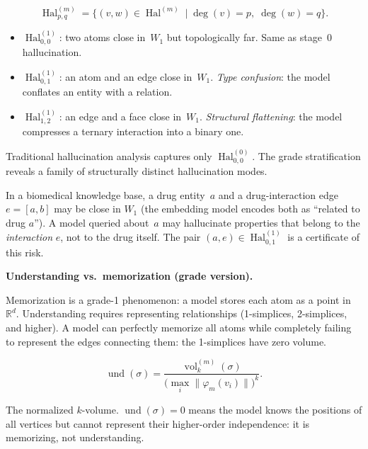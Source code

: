 \begin{definition}
\[
  \operatorname{Hal}^{(m)}_{p,q} = \{(v,w) \in \operatorname{Hal}^{(m)} \mid \deg(v) = p, \; \deg(w) = q\}.
\]
\begin{itemize}
\item $\operatorname{Hal}^{(1)}_{0,0}$: two atoms close in~$W_1$ but topologically far. Same as stage~0 hallucination.
\item $\operatorname{Hal}^{(1)}_{0,1}$: an atom and an edge close in~$W_1$. \emph{Type confusion}: the model conflates an entity with a relation.
\item $\operatorname{Hal}^{(1)}_{1,2}$: an edge and a face close in~$W_1$. \emph{Structural flattening}: the model compresses a ternary interaction into a binary one.
\end{itemize}
\end{definition}

Traditional hallucination analysis captures only $\operatorname{Hal}^{(0)}_{0,0}$. The grade stratification reveals a family of structurally distinct hallucination modes.

\begin{example}
In a biomedical knowledge base, a drug entity~$a$ and a drug-interaction edge~$e = [a, b]$ may be close in $W_1$ (the embedding model encodes both as ``related to drug $a$''). A model queried about~$a$ may hallucinate properties that belong to the \emph{interaction} $e$, not to the drug itself. The pair $(a, e) \in \operatorname{Hal}^{(1)}_{0,1}$ is a certificate of this risk.
\end{example}

\medskip

\textbf{Understanding vs.\ memorization (grade version).}

Memorization is a grade-1 phenomenon: a model stores each atom as a point in~$\mathbb{R}^d$. Understanding requires representing relationships (1-simplices, 2-simplices, and higher). A model can perfectly memorize all atoms while completely failing to represent the edges connecting them: the 1-simplices have zero volume.

\begin{definition}
\[
  \operatorname{und}(\sigma) = \frac{\operatorname{vol}_k^{(m)}(\sigma)}{\bigl(\max_i \|\varphi_m(v_i)\|\bigr)^k}.
\]
\end{definition}

The normalized $k$-volume. $\operatorname{und}(\sigma) = 0$ means the model knows the positions of all vertices but cannot represent their higher-order independence: it is memorizing, not understanding.

